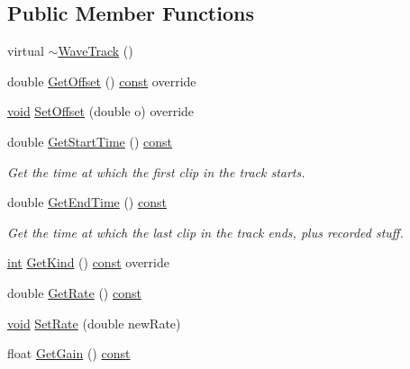 \subsection*{Public Member Functions}
\begin{DoxyCompactItemize}
\item 
virtual \hyperlink{class_wave_track_af60cfd7907bd8c1cbb7f263808e0eebe}{$\sim$\+Wave\+Track} ()
\item 
double \hyperlink{class_wave_track_af199a667b2c17d34c3428a58dbc0d556}{Get\+Offset} () \hyperlink{getopt1_8c_a2c212835823e3c54a8ab6d95c652660e}{const}  override
\item 
\hyperlink{sound_8c_ae35f5844602719cf66324f4de2a658b3}{void} \hyperlink{class_wave_track_ad46c588dfe6753fc8c1573bbc5517d1a}{Set\+Offset} (double o) override
\item 
double \hyperlink{class_wave_track_acd39f4f01272e112a2d132e48b60678e}{Get\+Start\+Time} () \hyperlink{getopt1_8c_a2c212835823e3c54a8ab6d95c652660e}{const} 
\begin{DoxyCompactList}\small\item\em Get the time at which the first clip in the track starts. \end{DoxyCompactList}\item 
double \hyperlink{class_wave_track_a73f81dee4dcb79e0df3bb6a85b866ae1}{Get\+End\+Time} () \hyperlink{getopt1_8c_a2c212835823e3c54a8ab6d95c652660e}{const} 
\begin{DoxyCompactList}\small\item\em Get the time at which the last clip in the track ends, plus recorded stuff. \end{DoxyCompactList}\item 
\hyperlink{xmltok_8h_a5a0d4a5641ce434f1d23533f2b2e6653}{int} \hyperlink{class_wave_track_a0a51b188c6a489be981f0af7792b718e}{Get\+Kind} () \hyperlink{getopt1_8c_a2c212835823e3c54a8ab6d95c652660e}{const}  override
\item 
double \hyperlink{class_wave_track_a18bbe6e1bb4b1016c3a3de835c33b8fa}{Get\+Rate} () \hyperlink{getopt1_8c_a2c212835823e3c54a8ab6d95c652660e}{const} 
\item 
\hyperlink{sound_8c_ae35f5844602719cf66324f4de2a658b3}{void} \hyperlink{class_wave_track_a0ab2aae5fbbcc2b0bd9da119727022ec}{Set\+Rate} (double new\+Rate)
\item 
float \hyperlink{class_wave_track_a2f8be921b1e2c2183e3a3eb367eb3416}{Get\+Gain} () \hyperlink{getopt1_8c_a2c212835823e3c54a8ab6d95c652660e}{const} 
\item 

\end{DoxyCompactItemize}
